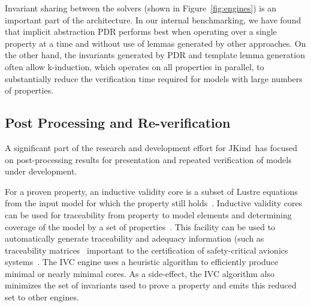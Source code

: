 \documentclass{llncs}
\newcommand{\jkind}{{\sc JKind}\xspace}
\newcommand{\lustre}{{\sc Lustre}\xspace}
\renewcommand{\paragraph}[1]{\vspace{5pt}\noindent {\bf #1}}
\begin{document}
Invariant sharing between the solvers (shown in Figure~\ref{fig:engines}) is an important part of the architecture.  In our internal benchmarking, we have found that implicit abstraction PDR performs best when operating over a single property at a time and without use of lemmas generated by other approaches.  On the other hand, the invariants generated by PDR and template lemma generation often allow k-induction, which operates on all properties in parallel, to substantially reduce the verification time required for models with large numbers of properties.  %

\subsection{Post Processing and Re-verification}

A significant part of the research and development effort for \jkind\ has focused on
post-processing results for presentation and repeated verification of models under development.


\paragraph{Inductive Validity Cores (IVC).} For a proven property, an inductive validity core is a subset of \lustre equations from the input model for which the property still
holds~\cite{ghassabani2016fse}.  Inductive validity cores can be used for traceability from property to model elements and determining coverage of the model by a set of properties~\cite{Ghass17Cov}.  This facility can be used to automatically generate traceability and adequacy information (such as traceability matrices~\cite{fifarek2017nfm} important to the certification of safety-critical avionics systems~\cite{DO178C}.
The IVC engine uses a heuristic algorithm to efficiently produce minimal or nearly minimal cores. As a side-effect, the IVC algorithm also minimizes the set of invariants used to prove a property and emits this reduced set to other engines.
\end{document}
